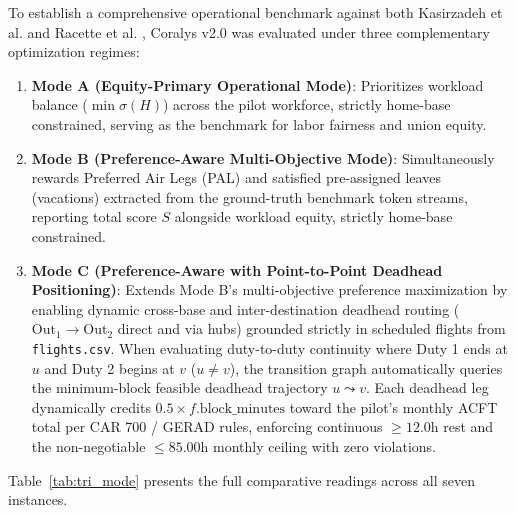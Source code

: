 \documentclass[journal]{IEEEtran}
\begin{document}
To establish a comprehensive operational benchmark against both Kasirzadeh et al. \cite{kasirzadeh2017} and Racette et al. \cite{racette2025}, Coralys v2.0 was evaluated under three complementary optimization regimes:
\begin{enumerate}
    \item \textbf{Mode A (Equity-Primary Operational Mode)}: Prioritizes workload balance ($\min \sigma(H)$) across the pilot workforce, strictly home-base constrained, serving as the benchmark for labor fairness and union equity.
    \item \textbf{Mode B (Preference-Aware Multi-Objective Mode)}: Simultaneously rewards Preferred Air Legs (PAL) and satisfied pre-assigned leaves (vacations) extracted from the ground-truth benchmark token streams, reporting total score $S$ alongside workload equity, strictly home-base constrained.
    \item \textbf{Mode C (Preference-Aware with Point-to-Point Deadhead Positioning)}: Extends Mode B's multi-objective preference maximization by enabling dynamic cross-base and inter-destination deadhead routing ($\text{Out}_1 \to \text{Out}_2$ direct and via hubs) grounded strictly in scheduled flights from \texttt{flights.csv}. When evaluating duty-to-duty continuity where Duty 1 ends at $u$ and Duty 2 begins at $v$ ($u \ne v$), the transition graph automatically queries the minimum-block feasible deadhead trajectory $u \leadsto v$. Each deadhead leg dynamically credits $0.5 \times f.\text{block\_minutes}$ toward the pilot's monthly ACFT total per CAR 700 / GERAD rules, enforcing continuous $\ge 12.0$h rest and the non-negotiable $\le 85.00$h monthly ceiling with zero violations.
\end{enumerate}

Table~\ref{tab:tri_mode} presents the full comparative readings across all seven instances.
\end{document}
